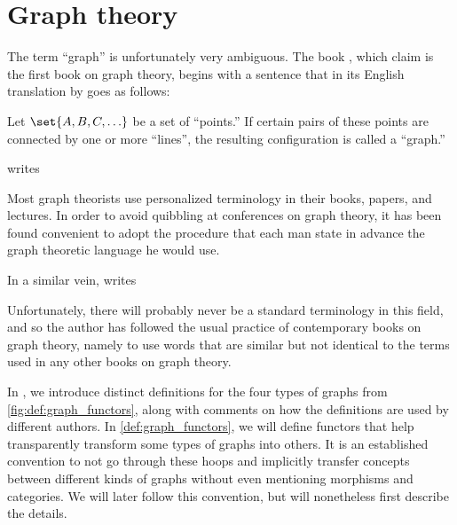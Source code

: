\chapter{Graph theory}\label{ch:graph_theory}

\begin{remark}\label{rem:graph_definition}
  The term \enquote{graph} is unfortunately very ambiguous. The book \cite{König1986Graphentheorie}, which \textcite{BiggsEtAl1986GraphTheoryHistory} claim is the first book on graph theory, begins with a sentence that in its English translation by \textcite[1]{König1990GraphTheory} goes as follows:
  \begin{displayquote}
    Let \( \set{ A, B, C, \ldots } \) be a set of \enquote{points.} If certain pairs of these points are connected by one or more \enquote{lines}, the resulting configuration is called a \enquote{graph.}
  \end{displayquote}

  \textcite[8]{Harary1969GraphTheory} writes
  \begin{displayquote}
    Most graph theorists use personalized terminology in their books, papers, and lectures. In order to avoid quibbling at conferences on graph theory, it has been found convenient to adopt the procedure that each man state in advance the graph theoretic language he would use.
  \end{displayquote}

  In a similar vein, \textcite[18]{Knuth1997ArtVol1} writes
  \begin{displayquote}
    Unfortunately, there will probably never be a standard terminology in this field, and so the author has followed the usual practice of contemporary books on graph theory, namely to use words that are similar but not identical to the terms used in any other books on graph theory.
  \end{displayquote}
\end{remark}

In , we introduce distinct definitions for the four types of graphs from \cref{fig:def:graph_functors}, along with comments on how the definitions are used by different authors. In \cref{def:graph_functors}, we will define functors that help transparently transform some types of graphs into others. It is an established convention to not go through these hoops and implicitly transfer concepts between different kinds of graphs without even mentioning morphisms and categories. We will later follow this convention, but will nonetheless first describe the details.

